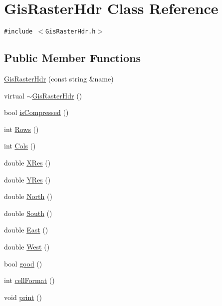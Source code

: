 \hypertarget{classGisRasterHdr}{
\section{Gis\-Raster\-Hdr Class Reference}
\label{classGisRasterHdr}
}
{\tt \#include $<$Gis\-Raster\-Hdr.h$>$}

\subsection*{Public Member Functions}
\begin{CompactItemize}
\item 
\hyperlink{classGisRasterHdr_a0}{Gis\-Raster\-Hdr} (const string \&name)
\item 
virtual \hyperlink{classGisRasterHdr_a1}{$\sim$Gis\-Raster\-Hdr} ()
\item 
bool \hyperlink{classGisRasterHdr_a2}{is\-Compressed} ()
\item 
int \hyperlink{classGisRasterHdr_a3}{Rows} ()
\item 
int \hyperlink{classGisRasterHdr_a4}{Cols} ()
\item 
double \hyperlink{classGisRasterHdr_a5}{XRes} ()
\item 
double \hyperlink{classGisRasterHdr_a6}{YRes} ()
\item 
double \hyperlink{classGisRasterHdr_a7}{North} ()
\item 
double \hyperlink{classGisRasterHdr_a8}{South} ()
\item 
double \hyperlink{classGisRasterHdr_a9}{East} ()
\item 
double \hyperlink{classGisRasterHdr_a10}{West} ()
\item 
bool \hyperlink{classGisRasterHdr_a11}{good} ()
\item 
int \hyperlink{classGisRasterHdr_a12}{cell\-Format} ()
\item 
void \hyperlink{classGisRasterHdr_a13}{print} ()
\end{CompactItemize}
